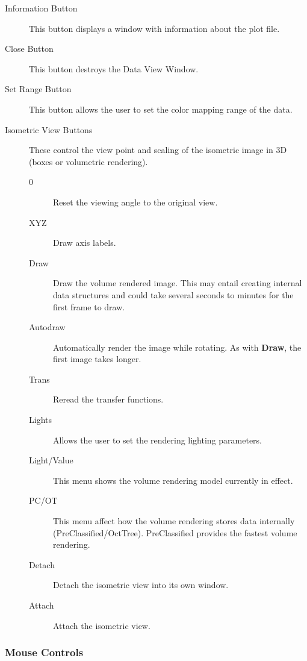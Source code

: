 \begin{description}
\item[Information Button]  This button displays a window with information
about the plot file.

\item[Close Button]  This button destroys the Data View Window.

\item[Set Range Button]  This button allows the user to set the color
mapping range of the data.

\item [Isometric View Buttons]  These control the view point and scaling
of the isometric image in 3D (boxes or volumetric rendering).

\begin{description}
    \item [0]           Reset the viewing angle to the original view.
    \item [XYZ]         Draw axis labels.
    \item [Draw]        Draw the volume rendered image.  This may entail
		        creating internal data structures and could take
		        several seconds to minutes for the first frame
			to draw.
    \item [Autodraw]    Automatically render the image while rotating.
			As with {\bf Draw}, the first image takes longer.
    \item [Trans]       Reread the transfer functions.
    \item [Lights]      Allows the user to set the rendering lighting parameters.
    \item[Light/Value]  This menu shows the volume rendering
                        model currently in effect.
    \item[PC/OT]        This menu affect how the volume rendering
                        stores data internally (PreClassified/OctTree).
			PreClassified provides the fastest volume rendering.
    \item [Detach]      Detach the isometric view into its own window.
    \item [Attach]      Attach the isometric view.
\end{description}

\end{description}


\subsubsection{Mouse Controls}

